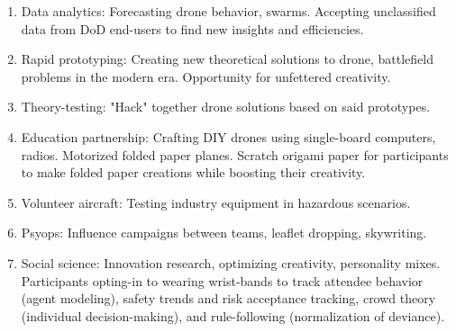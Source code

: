 \documentclass[10pt, letterpaper]{article}
\begin{document}
\begin{enumerate}
	
	\item Data analytics: Forecasting drone behavior, swarms. Accepting unclassified data from DoD end-users to find new insights and efficiencies.
	
	\item Rapid prototyping: Creating new theoretical solutions to drone, battlefield problems in the modern era. Opportunity for unfettered creativity.
	
	\item Theory-testing: "Hack" together drone solutions based on said prototypes.
	
	\item Education partnership: Crafting DIY drones using single-board computers, radios. Motorized folded paper planes. Scratch origami paper for participants to make folded paper creations while boosting their creativity.
	
	\item Volunteer aircraft: Testing industry equipment in hazardous scenarios. 
	
	\item Psyops: Influence campaigns between teams, leaflet dropping, skywriting. 
	
	\item Social science: Innovation research, optimizing creativity, personality mixes. Participants opting-in to wearing wrist-bands to track attendee behavior (agent modeling), safety trends and risk acceptance tracking, crowd theory (individual decision-making), and rule-following (normalization of deviance).

\end{enumerate}
\end{document}
